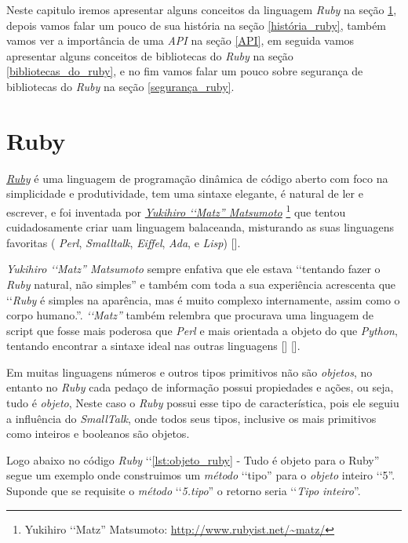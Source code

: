 Neste capitulo iremos apresentar alguns conceitos da linguagem \emph{Ruby} na seção \ref{ruby}, 
depois vamos falar um pouco de sua história na seção \ref{história_ruby}, também vamos ver 
a importância de uma \emph{API} na seção \ref{API}, em seguida vamos apresentar alguns conceitos 
de bibliotecas do \emph{Ruby} na seção \ref{bibliotecas_do_ruby}, e no fim vamos falar um pouco 
sobre segurança de bibliotecas do \emph{Ruby} na seção \ref{segurança_ruby}.

\section{Ruby}
\label{ruby}

\emph{\href{https://www.ruby-lang.org/en/}{Ruby}} é uma linguagem de programação 
dinâmica de código aberto com foco na simplicidade e produtividade, tem uma sintaxe elegante, é natural de 
ler e escrever, e foi inventada por \emph{ \href{http://www.rubyist.net/~matz/}{Yukihiro ‘‘Matz'' Matsumoto}}
\footnote{Yukihiro ‘‘Matz'' Matsumoto: \url{http://www.rubyist.net/~matz/}}
que tentou cuidadosamente criar uam linguagem balaceanda, misturando as suas linguagens favoritas 
( \emph{Perl}, \emph{Smalltalk}, \emph{Eiffel}, \emph{Ada}, e \emph{Lisp}) []. 

\emph{{Yukihiro ‘‘Matz'' Matsumoto}} sempre enfativa que ele estava ‘‘tentando fazer o \emph{Ruby} natural, não simples'' e também com toda a 
sua experiência acrescenta que ‘‘\emph{Ruby} é simples na aparência, mas é muito complexo internamente, assim 
como o corpo humano.''. \emph{‘‘Matz''} também relembra que procurava uma linguagem de script que fosse mais 
poderosa que \emph{Perl} e mais orientada a objeto do que \emph{Python}, tentando encontrar a 
sintaxe ideal nas outras linguagens [] []. 

Em muitas linguagens números e outros tipos primitivos não são \emph{objetos}, no entanto no \emph{Ruby} 
cada pedaço de informação possui propiedades e ações, ou seja, tudo é \emph{objeto}, Neste caso o 
\emph{Ruby} possui esse tipo de característica, pois ele seguiu a influência do \emph{SmallTalk}, onde 
todos seus tipos, inclusive os mais primitivos como inteiros e booleanos são objetos.

Logo abaixo no código \emph{Ruby} ‘‘\ref{lst:objeto_ruby} - Tudo é objeto para o Ruby'' segue um 
exemplo onde construimos um \emph{método} ‘‘tipo'' para o \emph{objeto} inteiro ‘‘5''. Suponde que se 
requisite o \emph{método} ‘‘\emph{5.tipo}'' o retorno seria ‘‘\emph{Tipo inteiro}''.

